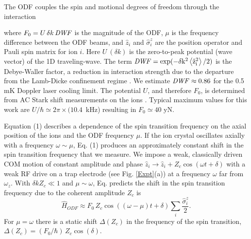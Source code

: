 \documentclass[aps,prl,twocolumn,superscriptaddress,floatfix]{revtex4-1}
\begin{document}
The ODF couples the spin and motional degrees of freedom through the interaction 

where $F_0= U \, \delta k \, \rm{\it{DWF}}$ is the magnitude of the ODF, $\mu$ is the frequency difference between the ODF beams, and $\hat{z}_{i}$ and $\hat{\sigma}^{z}_{i}$ are the position operator and Pauli spin matrix for ion $i$. Here $U\:(\delta k)$ is the zero-to-peak potential (wave vector) of the 1D traveling-wave. The term $\rm{\it{DWF}} = \exp(-\delta k^2 \left< \hat{z}^{2}_{i} \right> / 2)$ is the Debye-Waller factor, a reduction in interaction strength due to the departure from the Lamb-Dicke confinement regime . We estimate $\rm{\it{DWF}} \approx 0.86 $ for the 0.5 mK Doppler laser cooling limit. The potential $U$, and therefore $F_0$, is determined from AC Stark shift measurements on the ions . Typical maximum values for this work are $U/\hbar \simeq 2 \pi \times (10.4$~kHz) resulting in $F_0 \simeq 40$ yN.

Equation (1) describes a dependence of the spin transition frequency on the axial position of the ions and the ODF frequency $\mu$. If the ion crystal oscillates axially with a frequency $\omega\sim\mu$, Eq. (1) produces an approximately constant shift in the spin transition frequency that we measure. We impose a weak, classically driven COM motion of constant amplitude and phase $\hat{z}_i \rightarrow \hat{z}_i +Z_c\cos(\omega t+\delta)$ with a weak RF drive on a trap electrode (see Fig. \ref{Expt}(a)) at a frequency $\omega$ far from $\omega_{z}$. With $\delta k Z_c \ll 1$ and $\mu \sim \omega$, Eq. predicts the shift in the spin transition frequency due to the coherent amplitude $Z_c$ is
\begin{equation}
\hat{H}_{ODF} \approx F_{0} \, Z_c\cos((\omega - \mu)t + \delta) \sum_{i} \frac{\hat{\sigma}^{z}_{i}}{2} .
\end{equation}
For $\mu = \omega$ there is a static shift $\Delta(Z_c)$ in the frequency of the spin transition, $\Delta(Z_c) = (F_{0}/\hbar) \, Z_c \cos(\delta)$.
\end{document}
